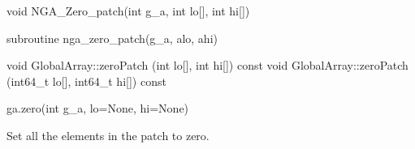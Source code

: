 \documentclass[12pt]{article}
\begin{document}

\begin{capi}
\begin{ccode}
void NGA_Zero_patch(int g_a, int lo[], int hi[])
\end{ccode}
\begin{funcargs}
\end{funcargs}
\end{capi}

\begin{fapi}
\begin{fcode}
subroutine nga_zero_patch(g_a, alo, ahi)
\end{fcode}
\begin{funcargs}
\end{funcargs}
\end{fapi}

\begin{cxxapi}
\begin{cxxcode}
void GlobalArray::zeroPatch (int lo[], int hi[]) const
void GlobalArray::zeroPatch (int64_t lo[], int64_t hi[]) const
\end{cxxcode}
\begin{funcargs}
\end{funcargs}
\end{cxxapi}

\begin{pyapi}
\begin{pycode}
ga.zero(int g_a, lo=None, hi=None)
\end{pycode}
\begin{funcargs}
\end{funcargs}
\end{pyapi}

\gcoll

\begin{desc}

Set all the elements in the patch to zero.

\end{desc}

\end{document}

